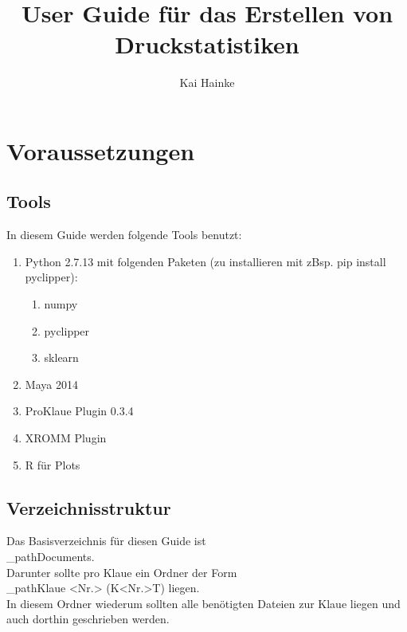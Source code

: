 \documentclass[a4paper, openany, oneside]{memoir}
\title{User Guide für das Erstellen von Druckstatistiken}
\author{Kai Hainke}
\begin{document}
\maketitle




\chapter{Voraussetzungen}
\section{Tools}
In diesem Guide werden folgende Tools benutzt:
\begin{enumerate}
\item Python 2.7.13 mit folgenden Paketen (zu installieren mit zBsp. pip install pyclipper):
\begin{enumerate}
\item numpy
\item pyclipper 
\item sklearn
\end{enumerate}
\item Maya 2014
\item ProKlaue Plugin 0.3.4
\item XROMM Plugin
\item R für Plots
\end{enumerate}

\section{Verzeichnisstruktur}
Das Basisverzeichnis für diesen Guide ist \\\dir_path{Documents\ProKlaue\testdaten\druck}.\\
Darunter sollte pro Klaue ein Ordner der Form  \\\dir_path{Klaue <Nr.> (K<Nr.>T)} liegen.\\ In diesem Ordner wiederum sollten alle benötigten Dateien zur Klaue liegen und auch dorthin geschrieben werden.
\end{document}

